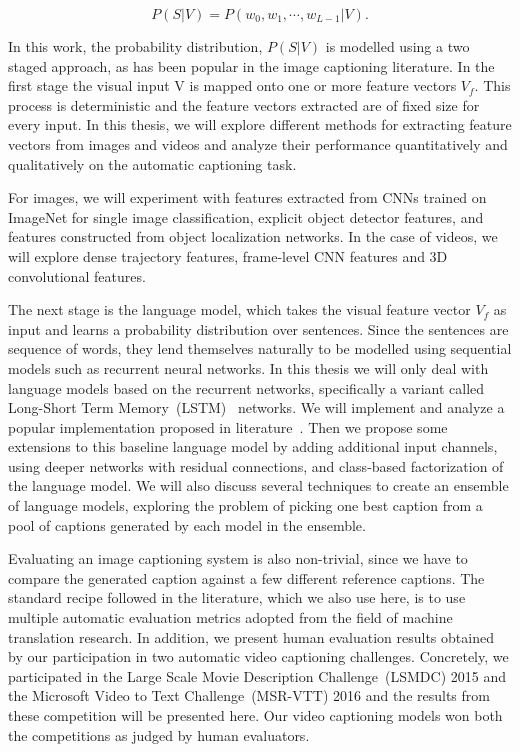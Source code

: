 \begin{equation}
\label{eq:langB1} P(S|V) = P(w_0, w_1, \cdots, w_{L-1}|V)  .
\end{equation}

In this work, the probability distribution, $P(S|V)$ is modelled using a two
staged approach, as has been popular in the image captioning literature. 
In the first stage the visual input V is mapped onto one or more feature
vectors $V_f$.
This process is deterministic and the feature vectors extracted are of fixed
size for every input. 
In this thesis, we will explore different methods for extracting feature
vectors from images and videos and analyze their performance quantitatively and
qualitatively on the automatic captioning task. 

For images, we will experiment with features extracted from CNNs trained on
ImageNet for single image classification, explicit object detector features, and
features constructed from object localization networks.
In the case of videos, we will explore dense trajectory features, frame-level
CNN features and 3D convolutional features. 

The next stage is the language model, which takes the visual feature vector
$V_f$ as input and learns a probability distribution over sentences.
Since the sentences are sequence of words, they lend themselves naturally to be
modelled using sequential models such as recurrent neural networks.
In this thesis we will only deal with language models based on the recurrent
networks, specifically a variant called Long-Short Term
Memory~(LSTM)~\cite{Hochreiter1997} networks.
We will implement and analyze a popular implementation proposed in
literature~\cite{Vinyals_2015_CVPR}.
Then we propose some extensions to this baseline language model by adding
additional input channels, using deeper networks with residual connections,
and class-based factorization of the language model. 
We will also discuss several techniques to create an ensemble of language
models, exploring the problem of picking one best caption from a pool of
captions generated by each model in the ensemble.

Evaluating an image captioning system is also non-trivial, since we have to
compare the generated caption against a few different reference captions.
The standard recipe followed in the literature, which we also use here, is to
use multiple automatic evaluation metrics adopted from the field of machine
translation research. 
In addition, we present human evaluation results obtained by our participation
in two automatic video captioning challenges.
Concretely, we participated in the Large Scale Movie Description
Challenge~(LSMDC) 2015 and the Microsoft Video to Text Challenge~(MSR-VTT) 2016
and the results from these competition will be presented here.
Our video captioning models won both the competitions as judged by human
evaluators.

